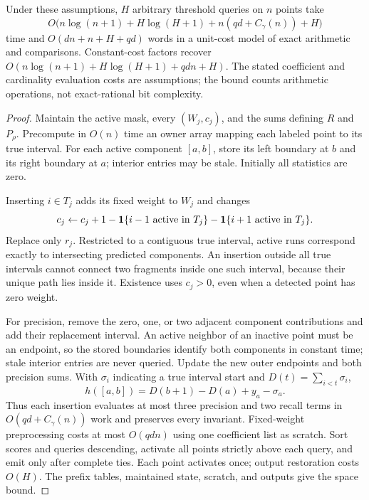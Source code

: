 \begin{theorem}
Under these assumptions, $H$ arbitrary threshold queries on $n$ points take
\[
 O\bigl(n\log(n+1)+H\log(H+1)+n(qd+C_\gamma(n))+H\bigr)
\]
time and $O(dn+n+H+qd)$ words in a unit-cost model of exact arithmetic and
comparisons. Constant-cost factors recover
$O(n\log(n+1)+\allowbreak H\log(H+1)+\allowbreak qdn+H)$.
The stated coefficient and cardinality evaluation costs are assumptions;
the bound counts arithmetic operations, not exact-rational bit complexity.
\end{theorem}
\begin{proof}
Maintain the active mask, every $(W_j,c_j)$, and the sums defining $R$ and
$P_\rho$. Precompute in $O(n)$ time an owner array mapping each labeled point
to its true interval. For each active component $[a,b]$, store its left boundary at $b$
and its right boundary at $a$; interior entries may be stale. Initially all
statistics are zero.

Inserting $i\in T_j$ adds its fixed weight to $W_j$ and changes
\[
 c_j\leftarrow c_j+1
 -\mathbf{1}\{i-1\text{ active in }T_j\}
 -\mathbf{1}\{i+1\text{ active in }T_j\}.
\]
Replace only $r_j$. Restricted to a contiguous true interval, active runs
correspond exactly to intersecting predicted components. An insertion outside
all true intervals cannot connect two fragments inside one such interval,
because their unique path lies inside it. Existence uses $c_j>0$, even when
a detected point has zero weight.

For precision, remove the zero, one, or two adjacent component contributions
and add their replacement interval. An active neighbor of an inactive point
must be an endpoint, so the stored boundaries identify both components in
constant time; stale interior entries are never queried. Update the new
outer endpoints and both precision sums. With $\sigma_i$ indicating a true
interval start and $D(t)=\sum_{i<t}\sigma_i$,
\[
 h([a,b])=D(b+1)-D(a)+y_a-\sigma_a.
\]
Thus each insertion evaluates at most three precision and two recall terms
in $O(qd+C_\gamma(n))$ work
and preserves every invariant. Fixed-weight preprocessing costs at most
$O(qdn)$ using one coefficient list as scratch. Sort scores and queries
descending, activate all points strictly above each query, and emit only
after complete ties. Each point activates once; output restoration costs
$O(H)$. The prefix tables, maintained state, scratch, and outputs give the
space bound.
\end{proof}

